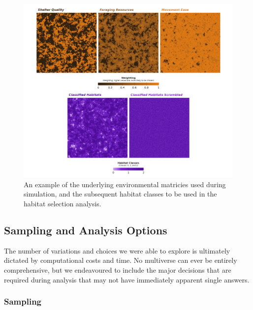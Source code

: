 \documentclass[10pt,a4paper]{article}
\begin{document}
\begin{figure}
\includegraphics[width=1\linewidth]{../figures/landscapeExample} \caption{An example of the underlying environmental matricies used during simulation, and the subsequent habitat classes to be used in the habitat selection analysis.}\label{fig:landscapeExample}
\end{figure}

\hypertarget{sampling-and-analysis-options}{%
\subsection{Sampling and Analysis Options}\label{sampling-and-analysis-options}}

The number of variations and choices we were able to explore is ultimately dictated by computational costs and time.
No multiverse can ever be entirely comprehensive, but we endeavoured to include the major decisions that are required during analysis that may not have immediately apparent single answers.

\hypertarget{sampling}{%
\subsubsection{Sampling}\label{sampling}}
\end{document}
